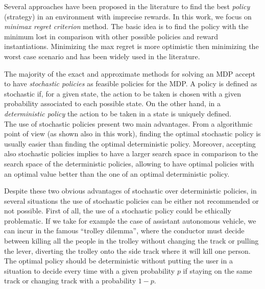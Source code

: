 \documentclass[runningheads,a4paper]{llncs}
\newcommand{\AO}[1]{{\color{red}{#1}}}
\begin{document}
Several approaches have been proposed in the literature to find the best \textit{policy} (strategy) in an environment with imprecise rewards. In this work, we focus on \textit{minimax regret criterion} method. The basic idea is to find the policy with the minimum lost in comparison with other possible policies and reward instantiations. Minimizing the max regret is more optimistic then  minimizing the worst case scenario and has been widely used in the literature. %

The majority of the exact and approximate methods for solving an MDP accept to have \textit{stochastic policies} as feasible policies for the MDP. A policy is defined as stochastic if, for a given state, the action to be taken is chosen with a given probability associated to each possible state.
On the other hand, in a \textit{deterministic policy} the action to be taken in a state is uniquely defined.\\
The use of stochastic policies present two main advantages. From a algorithmic point of view (as shown also in this work), finding the optimal stochastic policy is usually easier than finding the optimal deterministic policy. Moreover, accepting also stochastic policies implies to have a larger search space in comparison to the search space of the deterministic policies, allowing to have optimal policies with an optimal value better than the one of an optimal deterministic policy.

Despite these two obvious advantages of stochastic over deterministic policies, in several situations the use of stochastic policies can be either not recommended or not possible. First of all, the use of a stochastic policy could be ethically problematic. If we take for example the case of assistant autonomous vehicle, we can incur in the famous ``trolley dilemma'', where the conductor must decide between killing all the people in the trolley without changing the track or pulling the lever, diverting the trolley onto the side track where it will kill one person. The optimal policy should be deterministic without putting the user in a situation to decide every time with a given probability $p$ if staying on the same track or changing track with a probability $1-p$.

\end{document}
